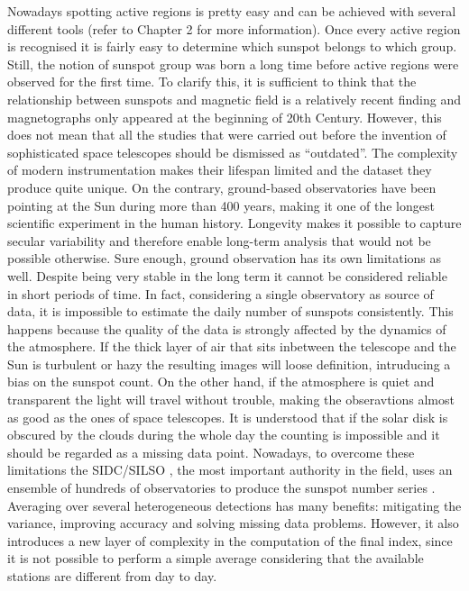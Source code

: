 \bigbreak
\noindent Nowadays spotting active regions is pretty easy and can be achieved with several different tools (refer to Chapter 2 for more information). Once every active region is recognised it is fairly easy to determine which sunspot belongs to which group. Still, the notion of sunspot group was born a long time before active regions were observed for the first time. To clarify this, it is sufficient to think that the relationship between sunspots and magnetic field is a relatively recent finding and magnetographs only appeared at the beginning of 20th Century. However, this does not mean that all the studies that were carried out before the invention of sophisticated space telescopes should be dismissed as ``outdated''. The complexity of modern instrumentation makes their lifespan limited and the dataset they produce quite unique. On the contrary, ground-based observatories have been pointing at the Sun during more than 400 years, making it one of the longest scientific experiment in the human history.
\bigbreak
\noindent Longevity makes it possible to capture secular variability and therefore enable long-term analysis that would not be possible otherwise. Sure enough, ground observation has its own limitations as well. Despite being very stable in the long term it cannot be considered reliable in short periods of time. In fact, considering a single observatory as source of data, it is impossible to estimate the daily number of sunspots consistently. This happens because the quality of the data is strongly affected by the dynamics of the atmosphere. If the thick layer of air that sits inbetween the telescope and the Sun is turbulent or hazy the resulting images will loose definition, intruducing a bias on the sunspot count. On the other hand, if the atmosphere is quiet and transparent the light will travel without trouble, making the obseravtions almost as good as the ones of space telescopes. It is understood that if the solar disk is obscured by the clouds during the whole day the counting is impossible and it should be regarded as a missing data point.
\bigbreak
\noindent Nowadays, to overcome these limitations the SIDC/SILSO \cite{sidc-silso}, the most important authority in the field, uses an ensemble of hundreds of observatories to produce the sunspot number series \cite{Clette2015}. Averaging over several heterogeneous detections has many benefits: mitigating the variance, improving accuracy and solving missing data problems. However, it also introduces a new layer of complexity in the computation of the final index, since it is not possible to perform a simple average considering that the available stations are different from day to day.
